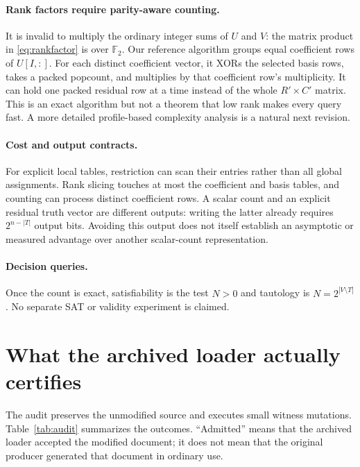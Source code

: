 \documentclass[11pt]{article}
\newcommand{\F}{\mathbb F_2}
\theoremstyle{definition}\newtheorem{definition}[theorem]{Definition}
\theoremstyle{remark}\newtheorem{remark}[theorem]{Remark}
\begin{document}
\paragraph{Rank factors require parity-aware counting.}
It is invalid to multiply the ordinary integer sums of $U$ and $V$: the matrix product in \eqref{eq:rankfactor} is over $\F$. Our reference algorithm groups equal coefficient rows of $U[I,:]$. For each distinct coefficient vector, it XORs the selected basis rows, takes a packed popcount, and multiplies by that coefficient row's multiplicity. It can hold one packed residual row at a time instead of the whole $R'\times C'$ matrix. This is an exact algorithm but not a theorem that low rank makes every query fast. A more detailed profile-based complexity analysis is a natural next revision.

\paragraph{Cost and output contracts.}
For explicit local tables, restriction can scan their entries rather than all global assignments. Rank slicing touches at most the coefficient and basis tables, and counting can process distinct coefficient rows. A scalar count and an explicit residual truth vector are different outputs: writing the latter already requires $2^{n-|T|}$ output bits. Avoiding this output does not itself establish an asymptotic or measured advantage over another scalar-count representation.

\paragraph{Decision queries.}
Once the count is exact, satisfiability is the test $N>0$ and tautology is $N=2^{|V\setminus T|}$. No separate SAT or validity experiment is claimed.

\section{What the archived loader actually certifies}
\label{sec:audit}
The audit preserves the unmodified source and executes small witness mutations. Table~\ref{tab:audit} summarizes the outcomes. ``Admitted'' means that the archived loader accepted the modified document; it does not mean that the original producer generated that document in ordinary use.
\end{document}
